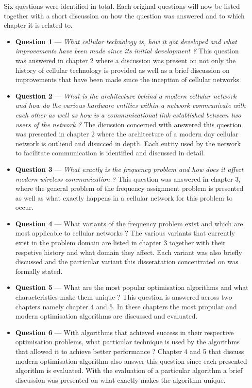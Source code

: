Six questions were identified in total. Each original questions will now be listed together with a short discussion on how the question was answered and to which chapter it is related to.
\begin{itemize}
\item \textbf{Question 1} --- \emph{What cellular technology is, how it got developed and what improvements have been made since its initial development ?} This question was answered in chapter 2 where a discussion was present on not only the history of cellular technology is provided as well as a brief discussion on improvements that have been made since the inception of cellular networks.
\item \textbf{Question 2} --- \emph{What is the architecture behind a modern cellular network and how do the various hardware entities within a network communicate with each other as well as how is a communicational link established between two users of the network ?}  The dicussion concerned with answered this question was presented in chapter 2 where the architecture of a modern day cellular network is outliend and disucced in depth. Each entity used by the network to facilitate communication is identified and discussed in detail.
\item \textbf{Question 3} --- \emph{What exactly is the frequency problem and how does it affect modern wireless communication ? } This question was answered in chapter 3, where the general problem of the frequency assignment problem is presented as well as what exactly happens in a cellular network for this problem to occur.
\item \textbf{Question 4} --- What variants of the frequency problem exist and which are most applicable to cellular networks ? The various variants that currently exist in the problem domain are listed in chapter 3 together with their respetive history and what domain they affect. Each variant was also briefly discussed and the particular variant this disseratation concentrated on was formally stated. 
\item \textbf{Question 5} --- What are the most popular optimisation algorithms and what characteristics make them unique ? This question is answered across two chapters namely chapter 4 and 5. In these chapters the most propular and modern optimisation algorithms are discussed and evaluated.
\item \textbf{Question 6} --- With algorithms that achieved success in their respective optimisation problems, what particular technique is used by the algorithms that allowed it to achieve better performance ? Chapter 4 and 5 that discuss modern optimisation algorithm also answer this question since each presented algorithm is evaluated. With the evaluation of a particular algorithm a brief discussion was presented on what exactly makes the algorithm unique.
\end{itemize}

